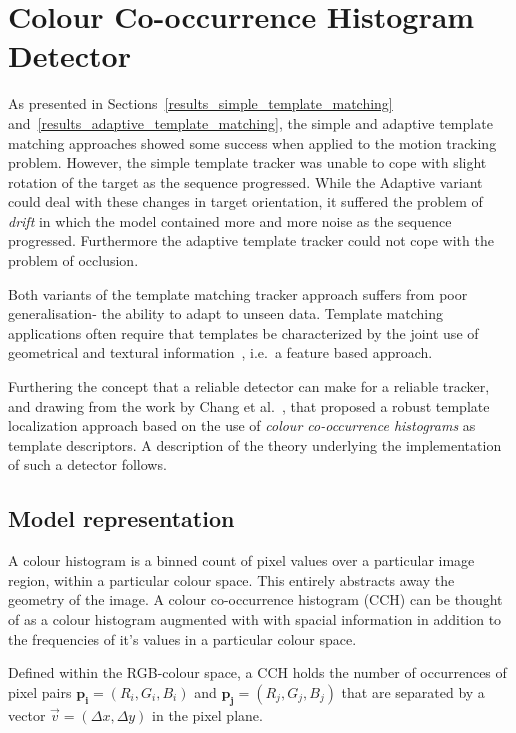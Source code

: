 
\section{Colour Co-occurrence Histogram Detector}\label{theoretical_framework_ch}
As presented in Sections~\ref{results_simple_template_matching} and~\ref{results_adaptive_template_matching}, 
the simple and adaptive template matching
approaches showed some success when applied to the motion
tracking problem. However, the simple template tracker was unable to cope with
slight rotation of the target as the sequence progressed.
While the Adaptive variant could deal with these changes in target
orientation, it suffered the problem of \textit{drift} in which the model contained
more and more noise as the sequence progressed.
Furthermore the adaptive template tracker could not cope with the problem of
occlusion.

Both variants of the template matching tracker approach suffers from poor generalisation- the
ability to adapt to unseen data. Template matching applications often require
that templates be characterized by the joint use of geometrical and textural
information~\cite{Brunelli}, i.e.\ a feature based approach.

Furthering the concept that a reliable detector can make for a reliable
tracker, and drawing from the work by Chang et al.~\cite{Chang1999}, that proposed a
robust template localization approach based on the use of \textit{colour co-occurrence
histograms} as template descriptors. A description of the theory underlying the
implementation of such a detector follows.

\subsection{Model representation}
A colour histogram is a binned count of pixel values over a particular image
region, within a particular colour space. This entirely abstracts away the geometry of
the image.
A colour co-occurrence histogram (CCH) can be thought of as a colour histogram
augmented with with spacial information in addition to the frequencies of it's
values in a particular colour
space.

Defined within the RGB-colour space, a CCH holds the number of occurrences of
pixel pairs $\mathbf{p_i}=(R_i,G_i,B_i)$ and $\mathbf{p_j}=(R_j,G_j,B_j)$ that
are separated by a vector $\vec{v}=(\Delta{x}, \Delta{y})$ in the pixel plane.


